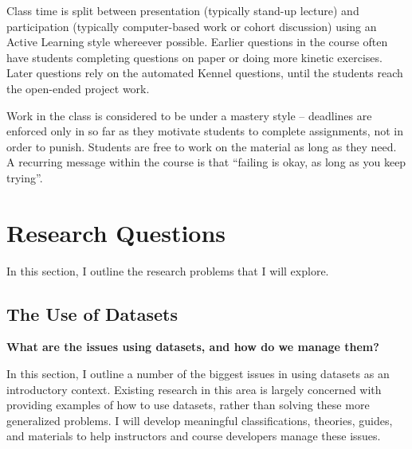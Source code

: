 Class time is split between presentation (typically stand-up lecture) and participation (typically computer-based work or cohort discussion) using an Active Learning style whereever possible.
Earlier questions in the course often have students completing questions on paper or doing more kinetic exercises.
Later questions rely on the automated Kennel questions, until the students reach the open-ended project work.

Work in the class is considered to be under a mastery style -- deadlines are enforced only in so far as they motivate students to complete assignments, not in order to punish.
Students are free to work on the material as long as they need.
A recurring message within the course is that ``failing is okay, as long as you keep trying''.

\section{Research Questions}

In this section, I outline the research problems that I will explore.

\subsection{The Use of Datasets}

\textbf{What are the issues using datasets, and how do we manage them?}

In this section, I outline a number of the biggest issues in using datasets as an introductory context.
Existing research in this area is largely concerned with providing examples of how to use datasets, rather than solving these more generalized problems.
I will develop meaningful classifications, theories, guides, and materials to help instructors and course developers manage these issues.

